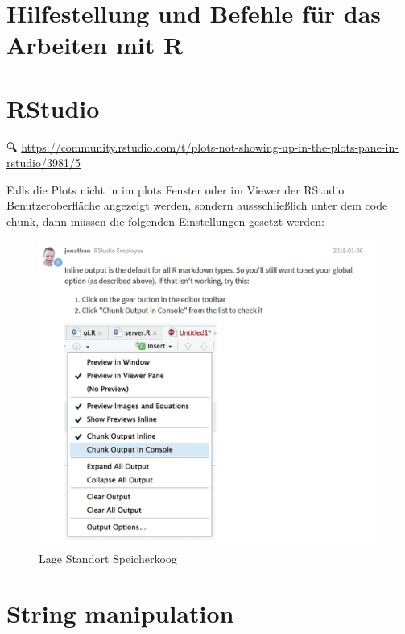 \documentclass[
]{article}
\begin{document}
\hypertarget{hilfestellung-und-befehle-fuxfcr-das-arbeiten-mit-r}{%
\section{Hilfestellung und Befehle für das Arbeiten mit R}\label{hilfestellung-und-befehle-fuxfcr-das-arbeiten-mit-r}}

\hypertarget{rstudio-1}{%
\section{RStudio}\label{rstudio-1}}

🔍 \url{https://community.rstudio.com/t/plots-not-showing-up-in-the-plots-pane-in-rstudio/3981/5}

Falls die Plots nicht in im plots Fenster oder im Viewer der RStudio Benutzeroberfläche angezeigt werden, sondern aussschließlich unter dem code chunk, dann müssen die folgenden Einstellungen gesetzt werden:

\begin{figure}

{\centering \includegraphics[width=10.97in]{images/047} 

}

\caption{Lage Standort Speicherkoog}\label{fig:unnamed-chunk-306}
\end{figure}

\hypertarget{string-manipulation}{%
\section{String manipulation}\label{string-manipulation}}
\end{document}
